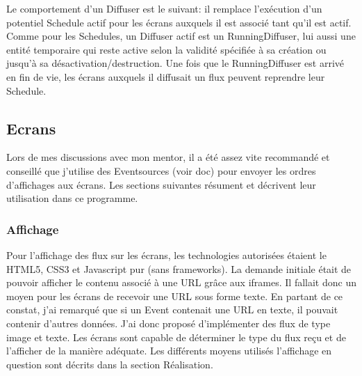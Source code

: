 \documentclass[french]{article}
\begin{document}
Le comportement d'un Diffuser est le suivant: il remplace l'exécution d'un potentiel Schedule actif pour les écrans auxquels il est associé tant qu'il est actif. \newline
Comme pour les Schedules, un Diffuser actif est un RunningDiffuser, lui aussi une entité temporaire qui reste active selon la validité spécifiée à sa création ou jusqu'à sa désactivation/destruction. Une fois que le RunningDiffuser est arrivé en fin de vie, les écrans auxquels il diffusait un flux peuvent reprendre leur Schedule.


\subsection{Ecrans}

Lors de mes discussions avec mon mentor, il a été assez vite recommandé et conseillé que j'utilise des Eventsources (voir doc) pour envoyer les ordres d'affichages aux écrans. Les sections suivantes résument et décrivent leur utilisation dans ce programme.

\subsubsection{Affichage}
Pour l'affichage des flux sur les écrans, les technologies autorisées étaient le HTML5, CSS3 et Javascript pur (sans frameworks). La demande initiale était de pouvoir afficher le contenu associé à une URL grâce aux iframes. Il fallait donc un moyen pour les écrans de recevoir une URL sous forme texte. En partant de ce constat, j'ai remarqué que si un Event contenait une URL en texte, il pouvait contenir d'autres données. J'ai donc proposé d'implémenter des flux de type image et texte. \newline
Les écrans sont capable de déterminer le type du flux reçu et de l'afficher de la manière adéquate. Les différents moyens utilisés l'affichage en question sont décrits dans la section Réalisation.
\end{document}
